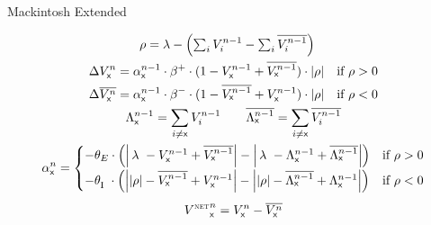 \documentclass[border=10pt,varwidth]{standalone}
\begin{document}
\newcommand{\eks}{\textsf{x}}
\newcommand{\longlambda}{\rlap{$\,\lambda$}\phantom{\left| \rho \right|}}
\newcommand{\longI}{\rlap{\textsubscript{I}}\phantom{\textsubscript{E}}}

\begin{center}
	\huge
	\sffamily
	Mackintosh Extended
\end{center}
\begin{gather*}
	\begin{aligned}
		\rho &= \lambda - \left( \textstyle\sum_i V_i^{n - 1} - \textstyle\sum_i \overline{V_i^{n - 1}} \right)
	\end{aligned} \\
	\begin{aligned}
		\Delta V_\eks^n &= \alpha_\eks^{n - 1} \cdot \beta^+ \cdot (1 - V_\eks^{n - 1} + \overline{V_\eks^{n - 1}}) \cdot \left| \rho \right| & \text{if } \rho > 0 \\
		 \Delta \overline{V_\eks^n} &= \alpha_\eks^{n - 1} \cdot \beta^- \cdot (1 - \overline{V_\eks^{n - 1}} + V_\eks^{n - 1}) \cdot \left| \rho \right| & \text{if } \rho < 0
	\end{aligned} \\
	\Lambda^{n - 1}_\eks = \sum_{i \neq \eks} V^{n - 1}_i \qquad
	\overline{\Lambda^{n - 1}_\eks} = \sum_{i \neq \eks} \overline{V^{n - 1}_i} \\
	\alpha_\eks^n =
		\begin{cases}
			- \theta_E \cdot \left( \left| \longlambda{} - V^{n - 1}_\eks + \overline{V^{n - 1}_\eks} \right| - \left| \longlambda{} - \Lambda^{n - 1}_\eks + \overline{\Lambda^{n - 1}_\eks} \right| \right) &\text{if } \rho > 0 \\[1ex]
			- \theta_{\longI{}} \cdot \left( \left| \left| \rho \right| - \overline{V^{n - 1}_\eks} + V^{n - 1}_\eks \right| - \left| \left| \rho \right| - \overline{\Lambda^{n - 1}_\eks} + \Lambda^{n - 1}_\eks \right| \right) &\text{if } \rho < 0
		\end{cases} \\[1ex]
	{V^{\text{\tiny\scshape NET}}}_\eks^n = V_\eks^n - \overline{V_\eks^n}
\end{gather*}

\nocite{mackintosh_original}

\end{document}
